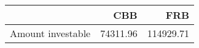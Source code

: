 \begin{tabular}{lrr}
\toprule
{} &       CBB &        FRB \\
\midrule
Amount investable &  74311.96 &  114929.71 \\
\bottomrule
\end{tabular}
